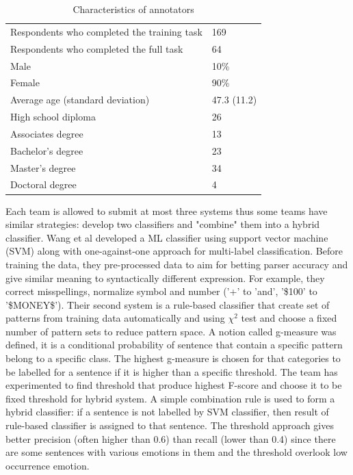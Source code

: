 \begin{table}
\noindent\begin{tabularx}{\textwidth}{ll}
\midrule
Respondents who completed the training task     &    169   \\
Respondents who completed the full task            &     64   \\
Male                                                                       &     10\%   \\
Female                                                                  &     90\%  \\
Average age (standard deviation)                        &    47.3 (11.2)  \\
High school diploma                                              &   26  \\
Associates degree                                               &    13  \\
Bachelor's degree                                                   &    23  \\
Master's degree                                                   &     34  \\
Doctoral degree                                                 &    4  \\
\bottomrule
\end{tabularx}
\caption{Characteristics of annotators}
\label{tab:annotator}
\end{table}
Each team is allowed to submit at most three systems thus some teams have similar strategies: develop two classifiers and "combine" them into a hybrid classifier. Wang et al \cite{Wang2012} developed a ML classifier using support vector machine (SVM) along with one-against-one approach for multi-label classification. Before training the data, they pre-processed data to aim for betting parser accuracy and give similar meaning to syntactically different expression. For example, they correct misspellings, normalize symbol and number (’+’ to ’and’, ’\$100’ to ’\$MONEY\$’). Their second system is a rule-based classifier that create set of patterns from training data automatically and using $\chi^2$ test and choose a fixed number of pattern sets to reduce pattern space. A notion called g-measure was defined, it is a conditional probability of sentence that contain a specific pattern belong to a specific class. The highest g-measure is chosen for that categories to be labelled for a sentence if it is higher than a specific threshold. The team has experimented to find threshold that produce highest F-score and choose it to be fixed threshold for hybrid system. A simple combination rule is used to form a hybrid classifier: if a sentence is not labelled by SVM classifier, then result of rule-based classifier is assigned to that sentence. The threshold approach gives better precision (often higher than 0.6) than recall (lower than 0.4) since there are some sentences with various emotions in them and the threshold overlook low occurrence emotion.\\
